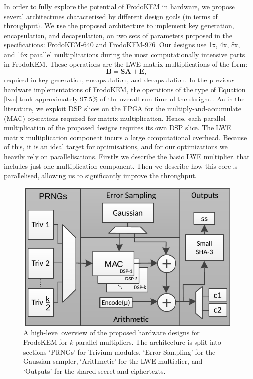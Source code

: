 In order to fully explore the potential of FrodoKEM in hardware, we propose several architectures characterized by different design goals (in terms of throughput). We use the proposed architecture to implement key generation, encapsulation, and decapsulation, on two sets of parameters proposed in the specifications: FrodoKEM-640 and FrodoKEM-976. Our designs use 1x, 4x, 8x, and 16x parallel multiplications during the most computationally intensive parts in FrodoKEM. These operations are the LWE matrix multiplications of the form:
\begin{equation}
\mathbf{B} = \mathbf{S} \mathbf{A} + \mathbf{E}, \label{lwe}
\end{equation}
 required in key generation, encapsulation, and decapsulation. In the previous hardware implementations of FrodoKEM, the operations of the type of Equation \ref{lwe} took approximately 97.5\% of the overall run-time of the designs \cite{howe2018standard}. As in the literature, we exploit DSP slices on the FPGA for the multiply-and-accumulate (MAC) operations required for matrix multiplication. Hence, each parallel multiplication of the proposed designs requires its own DSP slice. The LWE matrix multiplication component incurs a large computational overhead. Because of this, it is an ideal target for optimizations, and for our optimizations we heavily rely on parallelisations. Firstly we describe the basic LWE multiplier, that includes just one multiplication component. Then we describe how this core is parallelised, allowing us to significantly improve the throughput.
 
\begin{figure}[htbp]\centering
\includegraphics[scale=0.85]{figures/arch_new.pdf}
\caption{A high-level overview of the proposed hardware designs for FrodoKEM for $k$ parallel multipliers. The architecture is split into sections `PRNGs' for Trivium modules, `Error Sampling' for the Gaussian sampler, `Arithmetic' for the LWE multiplier, and `Outputs' for the shared-secret and ciphertexts.}\label{arch}
\end{figure}


